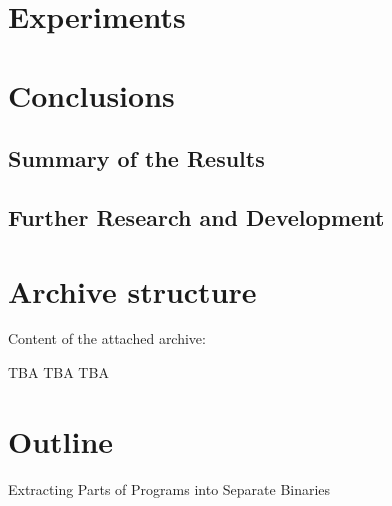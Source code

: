 \documentclass[12pt, twoside]{fithesis2}
\renewcommand{\_}{\leavevmode \kern0.07em\vbox{\hrule width0.4em}}
\begin{document}
\chapter{Experiments}
\label{chap:experiments}


\chapter{Conclusions}
\label{chap:conclusions}

\section{Summary of the Results}
\label{sec:conclusions-summary}


\section{Further Research and Development}
\label{sec:conclusions-next}



\appendix

\printbibliography

\chapter{Archive structure}
\label{appendix:archive}

Content of the attached archive:

TBA TBA TBA

\chapter{Outline}

Extracting Parts of Programs into Separate Binaries
\end{document}

